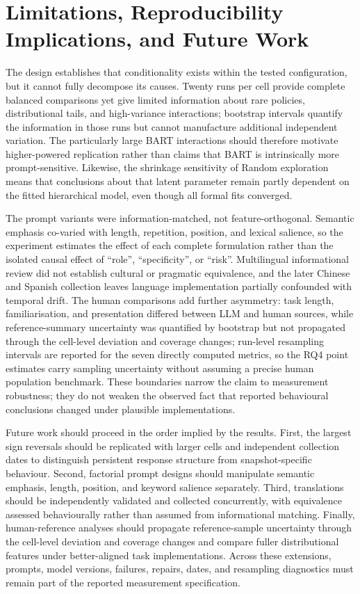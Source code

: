 \documentclass[logo,msc,inf]{infthesis}       %
\begin{document}
\section{Limitations, Reproducibility Implications, and Future Work}

The design establishes that conditionality exists within the tested configuration, but it cannot fully decompose its causes. Twenty runs per cell provide complete balanced comparisons yet give limited information about rare policies, distributional tails, and high-variance interactions; bootstrap intervals quantify the information in those runs but cannot manufacture additional independent variation. The particularly large BART interactions should therefore motivate higher-powered replication rather than claims that BART is intrinsically more prompt-sensitive. Likewise, the shrinkage sensitivity of Random exploration means that conclusions about that latent parameter remain partly dependent on the fitted hierarchical model, even though all formal fits converged.

The prompt variants were information-matched, not feature-orthogonal. Semantic emphasis co-varied with length, repetition, position, and lexical salience, so the experiment estimates the effect of each complete formulation rather than the isolated causal effect of ``role'', ``specificity'', or ``risk''. Multilingual informational review did not establish cultural or pragmatic equivalence, and the later Chinese and Spanish collection leaves language implementation partially confounded with temporal drift. The human comparisons add further asymmetry: task length, familiarisation, and presentation differed between LLM and human sources, while reference-summary uncertainty was quantified by bootstrap but not propagated through the cell-level deviation and coverage changes; run-level resampling intervals are reported for the seven directly computed metrics, so the RQ4 point estimates carry sampling uncertainty without assuming a precise human population benchmark. These boundaries narrow the claim to measurement robustness; they do not weaken the observed fact that reported behavioural conclusions changed under plausible implementations.

Future work should proceed in the order implied by the results. First, the largest sign reversals should be replicated with larger cells and independent collection dates to distinguish persistent response structure from snapshot-specific behaviour. Second, factorial prompt designs should manipulate semantic emphasis, length, position, and keyword salience separately. Third, translations should be independently validated and collected concurrently, with equivalence assessed behaviourally rather than assumed from informational matching. Finally, human-reference analyses should propagate reference-sample uncertainty through the cell-level deviation and coverage changes and compare fuller distributional features under better-aligned task implementations. Across these extensions, prompts, model versions, failures, repairs, dates, and resampling diagnostics must remain part of the reported measurement specification.
\end{document}
